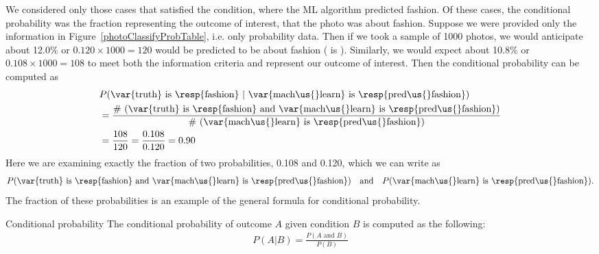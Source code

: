 We considered only those cases that satisfied the condition,
where the ML algorithm predicted fashion.
Of these cases, the conditional probability was the
fraction representing the outcome of interest, that the
photo was about fashion.
Suppose we were provided only the information in
Figure~\ref{photoClassifyProbTable}, i.e. only probability data.
Then if we took a sample of 1000 photos, we would anticipate
about 12.0\% or $0.120\times 1000 = 120$ would be predicted to be
about fashion ( is ).
Similarly, we would expect about 10.8\% or
$0.108\times 1000 = 108$ to meet both the information criteria
and represent our outcome of interest.
Then the conditional probability can be computed as
\begin{align*}
&P(\text{\var{truth} is \resp{fashion}}\ |\ 
    \text{\var{mach\us{}learn} is \resp{pred\us{}fashion}}) \\
  &= \frac{\text{\# (\var{truth} is \resp{fashion}
      and \var{mach\us{}learn} is \resp{pred\us{}fashion})}}
    {\text{\# (\var{mach\us{}learn} is \resp{pred\us{}fashion})}} \\
  &= \frac{108}{120}
		= \frac{0.108}{0.120}
		= 0.90
\end{align*}
Here we are examining exactly the fraction of two probabilities,
0.108 and 0.120, which we can write as
\begin{align*}
P(\text{\var{truth} is \resp{fashion} and
    \var{mach\us{}learn} is \resp{pred\us{}fashion}})
\quad\text{and}\quad
P(\text{\var{mach\us{}learn} is \resp{pred\us{}fashion}}).
\end{align*}
The fraction of these probabilities is an example of the
general formula for conditional probability.

\begin{onebox}{Conditional probability}
  The conditional probability of outcome $A$
  given condition $B$ is computed as the following:
  \begin{align*}
  P(A | B) = \frac{P(A\text{ and }B)}{P(B)}
  \end{align*}
\end{onebox}


